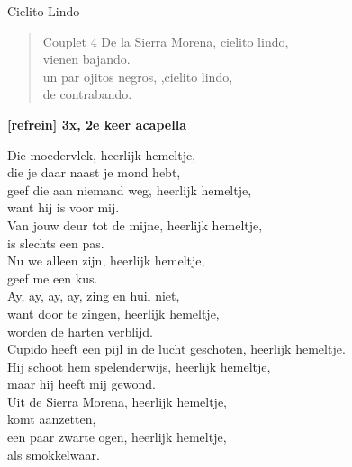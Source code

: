 \begin{song}[copla]{Cielito Lindo}
\newpage
\begin{verse}{Couplet 4}
De la Sierra Morena, cielito lindo,\\
vienen bajando.\\
\chord{}un par ojitos negros, ,cielito lindo,\\
de contrabando.\\
\end{verse}
\textbf{[refrein] 3x, 2e keer acapella}\\
\begin{translation}
Die moedervlek, heerlijk hemeltje,\\
die je daar naast je mond hebt,\\
geef die aan niemand weg, heerlijk hemeltje,\\
want hij is voor mij.\\
\vspace{1em}
Van jouw deur tot de mijne, heerlijk hemeltje,\\
is slechts een pas.\\
Nu we alleen zijn, heerlijk hemeltje,\\
geef me een kus.\\
\vspace{1em}
Ay, ay, ay, ay, zing en huil niet,\\
want door te zingen, heerlijk hemeltje,\\
worden de harten verblijd.\\
\vspace{1em}
Cupido heeft een pijl in de lucht geschoten, heerlijk hemeltje.\\
Hij schoot hem spelenderwijs, heerlijk hemeltje,\\
maar hij heeft mij gewond.\\
\vspace{1em}
Uit de Sierra Morena, heerlijk hemeltje,\\
komt aanzetten,\\
een paar zwarte ogen, heerlijk hemeltje,\\
als smokkelwaar.\\
\end{translation}
\end{song}
